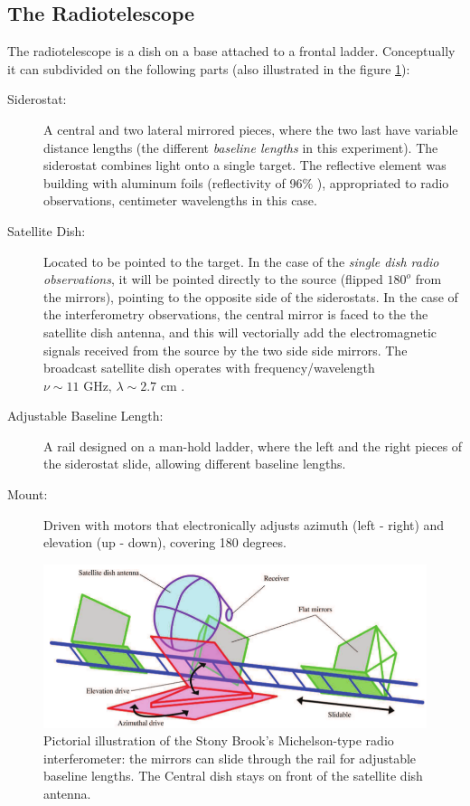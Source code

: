 \subsection{The Radiotelescope}\label{radio_interferometer}
The radiotelescope is a dish on a base attached to a frontal ladder. Conceptually it can subdivided on the following parts (also illustrated in the figure \ref{2-sketch}):
\begin{description}
\item [Siderostat:] A central and two lateral mirrored pieces, where the two last have  variable distance lengths (the different  {\it baseline lengths} in this experiment). The siderostat combines light onto a single target. The reflective element was building with aluminum foils (reflectivity of 96$\%$  \cite{sbu}), appropriated to radio observations, \eg centimeter wavelengths  in this case. 

\item [Satellite Dish:] Located to be pointed to the target. In the case of the {\it single dish radio observations}, it will be pointed directly to the source (flipped $180^o$ from the mirrors), \ie pointing to the opposite side of the siderostats. In the case of the interferometry observations,  the central mirror is faced to the the satellite dish antenna, and this  will vectorially add the electromagnetic signals received from the source by the two side side mirrors. The broadcast satellite dish operates with frequency/wavelength $\nu \sim 11 \mbox{ GHz, } \lambda \sim 2.7 \mbox{ cm}$ \cite{sbu}. 

\item [Adjustable Baseline Length:] A rail designed on a man-hold  ladder, where the left and the right pieces of the siderostat slide, allowing different  baseline lengths. 

\item [Mount:] Driven with motors that electronically adjusts azimuth (left - right) and elevation (up - down), covering 180 degrees.
\end{description}



 \begin{figure}[htb]
\begin{center}
 \includegraphics[scale=0.5]{figs/1.png}
\caption{Pictorial illustration of the Stony Brook's Michelson-type radio interferometer: the mirrors  can slide through the rail for adjustable baseline lengths. The Central dish stays on front of the satellite dish antenna. }
\label{2-sketch}
\end{center}
\end{figure}


